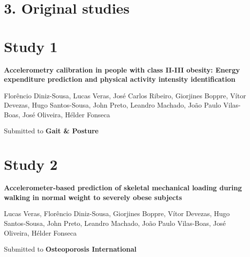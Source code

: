 \documentclass[12pt]{article}
\def\blankpage{%
      \clearpage%
      \thispagestyle{empty}%
      \addtocounter{page}{+0}%
      \null%
      \clearpage}
\begin{document}
\pagebreak
{}
\blankpage

\section*{\vfill\raggedleft\bfseries 3. Original studies}
\thispagestyle{empty} 
\blankpage

\section*{\vfill\raggedleft\bfseries Study 1}
\noindent \textbf{Accelerometry calibration in people with class II-III obesity: Energy expenditure prediction and physical activity intensity identification}

\bigskip

\noindent Florêncio Diniz-Sousa, Lucas Veras, José Carlos Ribeiro, Giorjines Boppre, Vítor Devezas, Hugo Santos-Sousa, John Preto, Leandro Machado, João Paulo Vilas-Boas, José Oliveira, Hélder Fonseca

\bigskip

\noindent Submitted to \textbf{Gait \& Posture}
\thispagestyle{empty}
\blankpage


\pagebreak

\section*{\vfill\raggedleft\bfseries Study 2}
\noindent \textbf{Accelerometer-based prediction of skeletal mechanical loading during walking in normal weight to severely obese subjects}

\bigskip

\noindent Lucas Veras, Florêncio Diniz-Sousa, Giorjines Boppre, Vítor Devezas, Hugo Santos-Sousa, John Preto, Leandro Machado, João Paulo Vilas-Boas, José Oliveira, Hélder Fonseca

\bigskip

\noindent Submitted to \textbf{Osteoporosis International}

\thispagestyle{empty}
\blankpage


\pagebreak
\end{document}
